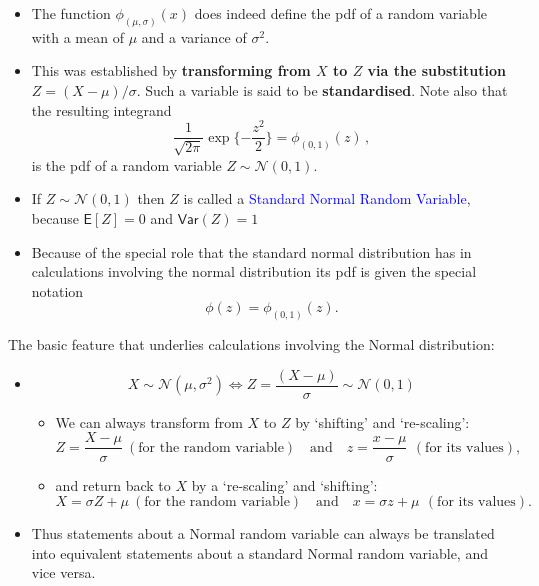 \documentclass[notes=show,smaller]{beamer}\usepackage[]{graphicx}\usepackage[]{color}
\newcommand{\N}{\mathcal{N}}
\newenvironment{stepitemize}{\begin{itemize}[<+->]}{\end{itemize} }
\begin{document}
\begin{frame}{\subsecname}
  \begin{stepitemize}
    \item The function $\phi_{(\mu,\sigma)}(x)$ does indeed define the pdf of a random variable with a mean of $\mu$ and a variance of $\sigma^2$.
  \item This was established by \textbf{transforming from $X$ to $Z$ via the substitution} $Z=(X-\mu)/\sigma$. Such a variable
  is said to be \textbf{standardised}. Note also that the resulting integrand
  $$
  \frac{1}{\sqrt{2\pi}}\exp{\{-\frac{z^2}{2}\}}=\phi_{(0,1)}(z)\,,
  $$
  is the pdf of a random variable $Z\sim \N(0,1)$.
  \item If $Z\sim \N(0,1)$ then $Z$ is called a \textcolor{blue}{Standard Normal Random Variable}, because
  $
  \textsf{E}[Z]=0$ and $\textsf{Var}(Z)=1$

  \item Because of the special role that the standard normal distribution has in
  calculations involving the normal distribution its pdf is given the special notation
  $$\phi(z)=\phi_{(0,1)}(z).$$
  \end{stepitemize}
\end{frame}

\begin{frame}{\subsecname}
  The basic feature that underlies calculations involving the Normal distribution:
  \begin{stepitemize}
  \item $$X\sim \N\left( \mu ,\sigma ^{2}\right)\Leftrightarrow Z=\frac{\left( X-\mu \right) }{\sigma }\sim \N\left( 0,1\right)$$
  \begin{stepitemize}
  \item We can always transform from $X$ to $Z$  by  `shifting' and `re-scaling':%
  \begin{equation*}
  Z=\frac{X-\mu }{\sigma } \ (\text{for the random variable}) \quad\mbox{and}\quad z=\frac{x-\mu }{\sigma }\,  \ (\text{for its values}) ,
  \end{equation*}
  \item and return back to $X$ by a `re-scaling' and `shifting':%
  \begin{equation*}
  X=\sigma Z+\mu  \ (\text{for the random variable}) \quad\mbox{and}\quad x=\sigma z+\mu\, \ (\text{for its values}) .
  \end{equation*}
  \end{stepitemize}
  \item Thus statements about a Normal random variable can always be translated into equivalent statements about a standard Normal random variable, and vice versa.
  \end{stepitemize}
\end{frame}
\end{document}
